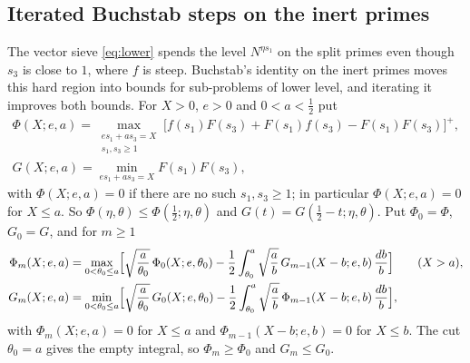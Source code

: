 \documentclass[11pt]{amsart}
\theoremstyle{remark}
\begin{document}
\subsection{Iterated Buchstab steps on the inert primes}
The vector sieve \eqref{eq:lower} spends the level $N^{\eta s_1}$ on the split primes even though $s_3$ is close to $1$, where $f$ is steep. Buchstab's identity on the inert primes moves this hard region into bounds for sub-problems of lower level, and iterating it improves both bounds. For $X>0$, $e>0$ and $0<a<\frac12$ put
\begin{gather*}
\Phi(X;e,a)=\max_{\substack{es_1+as_3=X\\ s_1,s_3\ge1}}\bigl[f(s_1)F(s_3)+F(s_1)f(s_3)-F(s_1)F(s_3)\bigr]^+,\\
G(X;e,a)=\min_{es_1+as_3=X}F(s_1)F(s_3),
\end{gather*}
with $\Phi(X;e,a)=0$ if there are no such $s_1,s_3\ge1$; in particular $\Phi(X;e,a)=0$ for $X\le a$. So $\Phi(\eta,\theta)\le\Phi(\frac12;\eta,\theta)$ and $G(t)=G(\frac12-t;\eta,\theta)$. Put $\Phi_0=\Phi$, $G_0=G$, and for $m\ge1$
\begin{align}
\Phi_m(X;e,a)&=\max_{0<\theta_0\le a}\Bigl[\sqrt{\frac a{\theta_0}}\,\Phi_0(X;e,\theta_0)-\frac12\int_{\theta_0}^{a}\sqrt{\frac ab}\,G_{m-1}(X-b;e,b)\,\frac{db}b\Bigr]\qquad(X>a),\label{eq:recP}\\
G_m(X;e,a)&=\min_{0<\theta_0\le a}\Bigl[\sqrt{\frac a{\theta_0}}\,G_0(X;e,\theta_0)-\frac12\int_{\theta_0}^{a}\sqrt{\frac ab}\,\Phi_{m-1}(X-b;e,b)\,\frac{db}b\Bigr],\label{eq:recG}
\end{align}
with $\Phi_m(X;e,a)=0$ for $X\le a$ and $\Phi_{m-1}(X-b;e,b)=0$ for $X\le b$. The cut $\theta_0=a$ gives the empty integral, so $\Phi_m\ge\Phi_0$ and $G_m\le G_0$.
\end{document}
